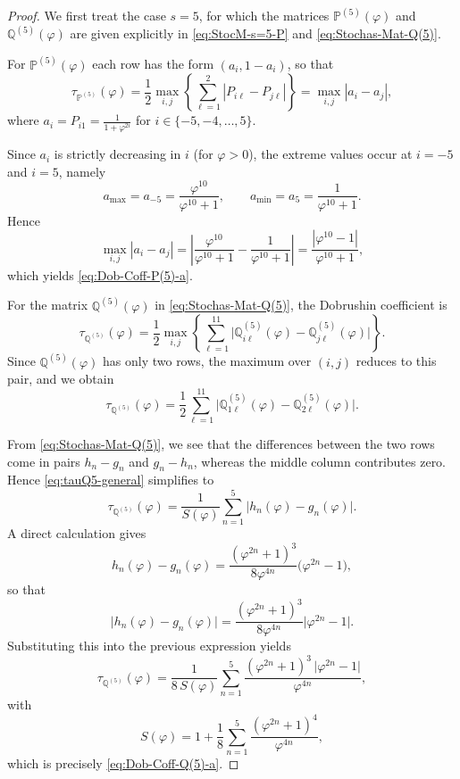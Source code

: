 \documentclass[10pt,a4paper]{amsart}
\begin{document}
\begin{proof}
We first treat the case $s=5$, for which the matrices
$\mathbb{P}^{(5)}(\varphi)$ and $\mathbb{Q}^{(5)}(\varphi)$ are given explicitly
in \eqref{eq:StocM-s=5-P} and \eqref{eq:Stochas-Mat-Q(5)}.

For $\mathbb{P}^{(5)}(\varphi)$ each row has the form $(a_i,1-a_i)$, so that
\[
\tau_{\mathbb{P}^{(5)}}(\varphi)
= \frac{1}{2}\max_{i,j} \left\{\sum_{\ell=1}^{2} |P_{i\ell} - P_{j\ell}|\right\}
= \max_{i,j} |a_i - a_j|,
\]
where $a_i = P_{i1}=\frac{1}{1+\varphi^{2i}}$ for $i\in\{-5,-4,\dots,5\}$.

Since $a_i$ is strictly decreasing in $i$ (for $\varphi>0$), the extreme values
occur at $i=-5$ and $i=5$, namely
\[
a_{\max} = a_{-5}=\frac{\varphi^{10}}{\varphi^{10} + 1},
\qquad
a_{\min} = a_{5}=\frac{1}{\varphi^{10} + 1}.
\]
Hence
\[
\max_{i,j} |a_i - a_j|
=
\left|\frac{\varphi^{10}}{\varphi^{10} + 1}
      -\frac{1}{\varphi^{10} + 1}\right|
=
\frac{|\varphi^{10} - 1|}{\varphi^{10} + 1},
\]
which yields \eqref{eq:Dob-Coff-P(5)-a}.

For the matrix $\mathbb{Q}^{(5)}(\varphi)$ in \eqref{eq:Stochas-Mat-Q(5)}, the
Dobrushin coefficient is
\[
\tau_{\mathbb{Q}^{(5)}}(\varphi)
=
\frac{1}{2}\max_{i,j}\left\{\sum_{\ell=1}^{11}
\bigl|\mathbb{Q}^{(5)}_{i\ell}(\varphi) - \mathbb{Q}^{(5)}_{j\ell}(\varphi)\bigr|\right\}.
\]
Since $\mathbb{Q}^{(5)}(\varphi)$ has only two rows, the maximum over $(i,j)$
reduces to this pair, and we obtain
\begin{equation}\label{eq:tauQ5-general}
\tau_{\mathbb{Q}^{(5)}}(\varphi)
=
\frac{1}{2}\sum_{\ell=1}^{11}
\bigl|\mathbb{Q}^{(5)}_{1\ell}(\varphi) - \mathbb{Q}^{(5)}_{2\ell}(\varphi)\bigr|.
\end{equation}

From \eqref{eq:Stochas-Mat-Q(5)}, we see that the differences between the two rows come in pairs
$h_n-g_n$ and $g_n-h_n$, whereas the middle column contributes zero. Hence
\eqref{eq:tauQ5-general} simplifies to
\[
\tau_{\mathbb{Q}^{(5)}}(\varphi)
=
\frac{1}{S(\varphi)}
\sum_{n=1}^{5} \bigl|h_n(\varphi) - g_n(\varphi)\bigr|.
\]
A direct calculation gives
\[
h_n(\varphi)-g_n(\varphi)
=
\frac{(\varphi^{2n}+1)^3}{8\varphi^{4n}}\bigl(\varphi^{2n}-1\bigr),
\]
so that
\[
\bigl|h_n(\varphi)-g_n(\varphi)\bigr|
=
\frac{(\varphi^{2n}+1)^3}{8\varphi^{4n}}\bigl|\varphi^{2n}-1\bigr|.
\]
Substituting this into the previous expression yields
\[
\tau_{\mathbb{Q}^{(5)}}(\varphi)
=
\frac{1}{8\,S(\varphi)}
\sum_{n=1}^{5}
\frac{(\varphi^{2n}+1)^3\,\bigl|\varphi^{2n}-1\bigr|}{\varphi^{4n}},
\]
with
\[
S(\varphi)
=
1+\frac18\sum_{n=1}^{5}\frac{(\varphi^{2n}+1)^4}{\varphi^{4n}},
\]
which is precisely \eqref{eq:Dob-Coff-Q(5)-a}.


\end{proof}
\end{document}

